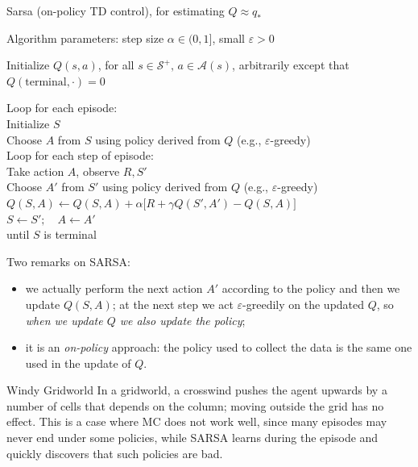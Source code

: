 \begin{algobox}{Sarsa (on-policy TD control), for estimating $Q \approx q_*$}
\raggedright
Algorithm parameters: step size $\alpha \in (0,1]$, small $\varepsilon > 0$

\medskip
Initialize $Q(s,a)$, for all $s \in \mathcal{S}^+,\, a \in \mathcal{A}(s)$, arbitrarily except that $Q(\text{terminal},\cdot) = 0$

\medskip
Loop for each episode:\\
\hspace*{1.5em}Initialize $S$\\
\hspace*{1.5em}Choose $A$ from $S$ using policy derived from $Q$ (e.g., $\varepsilon$-greedy)\\
\hspace*{1.5em}Loop for each step of episode:\\
\hspace*{3em}Take action $A$, observe $R, S'$\\
\hspace*{3em}Choose $A'$ from $S'$ using policy derived from $Q$ (e.g., $\varepsilon$-greedy)\\
\hspace*{3em}$Q(S,A) \leftarrow Q(S,A) + \alpha \bigl[R + \gamma Q(S',A') - Q(S,A)\bigr]$\\
\hspace*{3em}$S \leftarrow S';\quad A \leftarrow A'$\\
\hspace*{1.5em}until $S$ is terminal
\end{algobox}

Two remarks on SARSA:
\begin{itemize}
    \item we actually perform the next action $A'$ according to the policy and then we update $Q(S,A)$; at the next step we act $\varepsilon$-greedily on the updated $Q$, so \emph{when we update $Q$ we also update the policy};
    \item it is an \emph{on-policy} approach: the policy used to collect the data is the same one used in the update of $Q$.
\end{itemize}

\begin{esempio}{Windy Gridworld}
In a gridworld, a crosswind pushes the agent upwards by a number of cells that depends on the column; moving outside the grid has no effect. This is a case where MC does not work well, since many episodes may never end under some policies, while SARSA learns during the episode and quickly discovers that such policies are bad.
\end{esempio}

